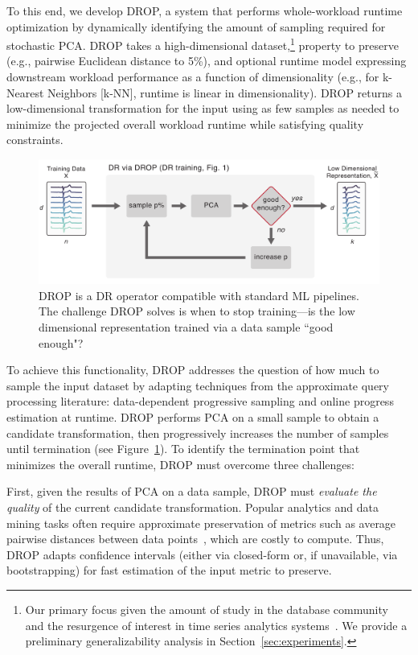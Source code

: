 To this end, we develop DROP, a system that performs whole-workload runtime optimization by dynamically identifying the amount of sampling required for stochastic PCA.
DROP takes a high-dimensional dataset,\footnote{Our primary focus  given the amount of study in the database community~\cite{keogh-study} and the resurgence of interest in time series analytics systems~\cite{macrobase,macrobase-cidr,trill-signal}. We provide a preliminary generalizability analysis in Section~\ref{sec:experiments}.}  property to preserve (e.g., pairwise Euclidean distance to 5\%), and optional runtime model expressing downstream workload performance as a function of dimensionality (e.g., for k-Nearest Neighbors [k-NN], runtime is linear in dimensionality). 
DROP returns a low-dimensional transformation for the input using as few samples as needed to minimize the projected overall workload runtime while satisfying quality constraints.

\begin{figure}
\includegraphics[width=\linewidth]{figs/basic.pdf}
\caption[]{DROP is a DR operator compatible with standard ML pipelines. The challenge DROP solves is when to stop training---is the low dimensional representation trained via a data sample ``good enough"?}
\label{fig:basic}
\end{figure}


To achieve this functionality, DROP addresses the question of how much to sample the input dataset by adapting techniques from the approximate query processing literature: data-dependent progressive sampling and online progress estimation at runtime.  
DROP performs PCA on a small sample to obtain a candidate transformation, then progressively increases the number of samples until termination (see Figure~\ref{fig:basic}). 
To identify the termination point that minimizes the overall runtime, DROP must overcome three challenges:

First, given the results of PCA on a data sample, DROP must \emph{evaluate the quality} of the current candidate transformation.
Popular analytics and data mining tasks often require approximate preservation of metrics such as average pairwise distances between data points~\cite{time-series-dm,dm-book,wand}, which are costly to compute.
Thus, DROP adapts confidence intervals (either via closed-form or, if unavailable, via bootstrapping) for fast estimation of the input metric to preserve.


